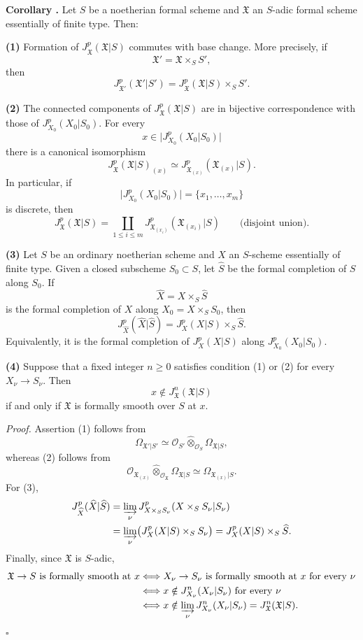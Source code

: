 \medskip
\noindent\textbf{Corollary .}
Let $S$ be a noetherian formal scheme and $\mathfrak X$ an $S$-adic
formal scheme essentially of finite type. Then:

\smallskip
\noindent\textbf{(1)} Formation of
$J_{\mathfrak X}^p(\mathfrak X|S)$ commutes with base change. More
precisely, if
\[
\mathfrak X'=\mathfrak X\times_SS',
\]
then
\[
J_{\mathfrak X'}^p(\mathfrak X'|S')
=J_{\mathfrak X}^p(\mathfrak X|S)\times_SS'.
\]

\smallskip
\noindent\textbf{(2)} The connected components of
$J_{\mathfrak X}^p(\mathfrak X|S)$ are in bijective correspondence
with those of $J_{X_0}^p(X_0|S_0)$. For every
\[
x\in\bigl|J_{X_0}^p(X_0|S_0)\bigr|
\]
there is a canonical isomorphism
\[
J_{\mathfrak X}^p(\mathfrak X|S)_{(x)}
\simeq
J_{\mathfrak X_{(x)}}^p(\mathfrak X_{(x)}|S).
\]
In particular, if
\[
\bigl|J_{X_0}^p(X_0|S_0)\bigr|=\{x_1,\ldots,x_m\}
\]
is discrete, then
\[
J_{\mathfrak X}^p(\mathfrak X|S)
=\coprod_{1\leq i\leq m}
 J_{\mathfrak X_{(x_i)}}^p(\mathfrak X_{(x_i)}|S)
\qquad\text{(disjoint union)}.
\]


\smallskip
\noindent\textbf{(3)} Let $S$ be an ordinary noetherian scheme and
$X$ an $S$-scheme essentially of finite type. Given a closed
subscheme $S_0\subset S$, let $\widehat S$ be the formal completion
of $S$ along $S_0$. If
\[
\widehat X=X\times_S\widehat S
\]
is the formal completion of $X$ along
$X_0=X\times_SS_0$, then
\[
J_{\widehat X}^p(\widehat X|\widehat S)
=J_X^p(X|S)\times_S\widehat S.
\]
Equivalently, it is the formal completion of $J_X^p(X|S)$ along
$J_{X_0}^p(X_0|S_0)$.

\smallskip
\noindent\textbf{(4)} Suppose that a fixed integer $n\geq0$
satisfies condition (1) or (2) for every
$X_\nu\longrightarrow S_\nu$. Then
\[
x\notin J_{\mathfrak X}^n(\mathfrak X|S)
\]
if and only if $\mathfrak X$ is formally smooth over $S$ at $x$.

\smallskip
\noindent\textit{Proof.}
Assertion (1) follows from
\[
\Omega_{\mathfrak X'|S'}
\simeq
\mathcal O_{S'}\widehat\otimes_{\mathcal O_S}
\Omega_{\mathfrak X|S},
\]
whereas (2) follows from
\[
\mathcal O_{\mathfrak X_{(x)}}
\widehat\otimes_{\mathcal O_{\mathfrak X}}
\Omega_{\mathfrak X|S}
\simeq\Omega_{\mathfrak X_{(x)}|S}.
\]
For (3),
\[
\begin{aligned}
J_{\widehat X}^p(\widehat X|\widehat S)
&=\varinjlim_\nu
 J_{X\times_SS_\nu}^p(X\times_SS_\nu|S_\nu) \\
&=\varinjlim_\nu\bigl(J_X^p(X|S)\times_SS_\nu\bigr)
 =J_X^p(X|S)\times_S\widehat S.
\end{aligned}
\]
Finally, since $\mathfrak X$ is $S$-adic,
\[
\begin{aligned}
\mathfrak X\to S\text{ is formally smooth at }x
&\Longleftrightarrow
 X_\nu\to S_\nu\text{ is formally smooth at }x
 \text{ for every }\nu \\
&\Longleftrightarrow
 x\notin J_{X_\nu}^n(X_\nu|S_\nu)
 \text{ for every }\nu \\
&\Longleftrightarrow
 x\notin\varinjlim_\nu J_{X_\nu}^n(X_\nu|S_\nu)
 =J_{\mathfrak X}^n(\mathfrak X|S).
\end{aligned}
\]
\hfill$\square$
